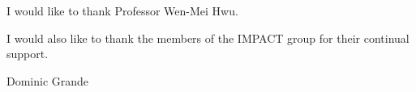 I would like to thank Professor Wen-Mei Hwu.

I would also like to thank the members of the IMPACT group for their continual support.

Dominic Grande
